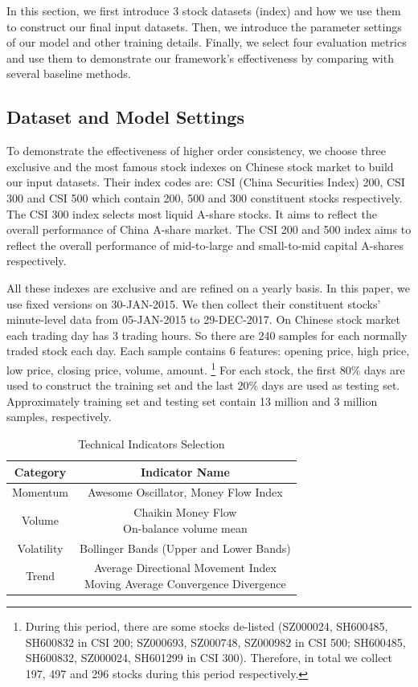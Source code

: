 \documentclass[sigconf,anonymous,review]{acmart}
\begin{document}
In this section, we first introduce 3 stock datasets (index) and
how we use them to construct our final input datasets. Then, we
introduce the parameter settings of our model and other training
details. Finally, we select four evaluation metrics and use them
to demonstrate our framework's effectiveness by comparing with
several baseline methods.

\subsection{Dataset and Model Settings}
\label{sec:dataset}

To demonstrate the effectiveness of higher order consistency, we
choose three exclusive and the most famous stock indexes on Chinese
stock market to build our input datasets. Their index codes are:
CSI (China Securities Index) 200, CSI 300 and CSI 500 which
contain 200, 500 and 300 constituent stocks respectively. The CSI
300 index selects most liquid A-share stocks. It aims to reflect
the overall performance of China A-share market. The CSI 200 and
500 index aims to reflect the overall performance of mid-to-large
and small-to-mid capital A-shares respectively.

All these indexes are exclusive and are refined on a yearly
basis. In this paper, we use fixed versions on 30-JAN-2015. We
then collect their constituent stocks' minute-level data from
05-JAN-2015 to 29-DEC-2017. On Chinese stock market each trading
day has 3 trading hours. So there are 240 samples for each
normally traded stock each day. Each sample contains 6 features:
opening price, high price, low price, closing price, volume,
amount. \footnote{During this period, there are some stocks
  de-listed (SZ000024, SH600485, SH600832 in CSI 200; SZ000693,
  SZ000748, SZ000982 in CSI 500; SH600485, SH600832, SZ000024,
  SH601299 in CSI 300). Therefore, in total we collect 197, 497
  and 296 stocks during this period respectively.} For each
stock, the first $80\%$ days are used to construct the training
set and the last $20\%$ days are used as testing set.
Approximately training set and testing set contain 13 million and
3 million samples, respectively.

\begin{table}[H]
\centering
\small
\caption{Technical Indicators Selection}
\begin{tabular}{|c|c|} \hline
  Category&Indicator Name\\ \hline
  Momentum& Awesome Oscillator, Money Flow Index\\ \hline
  Volume& \makecell{Chaikin Money Flow\\ On-balance volume mean}\\ \hline
  Volatility& Bollinger Bands (Upper and Lower Bands)\\ \hline
  Trend& \makecell{Average Directional Movement Index\\Moving Average Convergence Divergence}\\ \hline
\end{tabular}
  \label{tab:ta}
\end{table}
\end{document}
